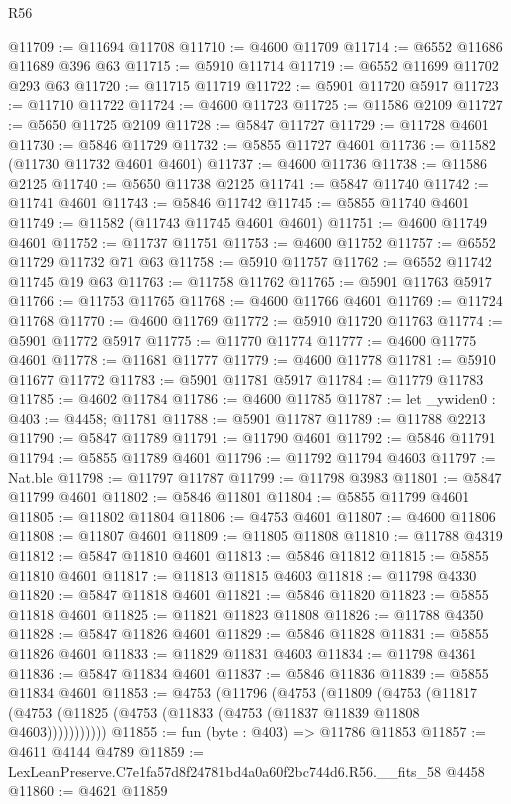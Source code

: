 \begin{lexlean}{R56}
\begin{coremodule}
@11709 := @11694 @11708
@11710 := @4600 @11709
@11714 := @6552 @11686 @11689 @396 @63
@11715 := @5910 @11714
@11719 := @6552 @11699 @11702 @293 @63
@11720 := @11715 @11719
@11722 := @5901 @11720 @5917
@11723 := @11710 @11722
@11724 := @4600 @11723
@11725 := @11586 @2109
@11727 := @5650 @11725 @2109
@11728 := @5847 @11727
@11729 := @11728 @4601
@11730 := @5846 @11729
@11732 := @5855 @11727 @4601
@11736 := @11582 (@11730 @11732 @4601 @4601)
@11737 := @4600 @11736
@11738 := @11586 @2125
@11740 := @5650 @11738 @2125
@11741 := @5847 @11740
@11742 := @11741 @4601
@11743 := @5846 @11742
@11745 := @5855 @11740 @4601
@11749 := @11582 (@11743 @11745 @4601 @4601)
@11751 := @4600 @11749 @4601
@11752 := @11737 @11751
@11753 := @4600 @11752
@11757 := @6552 @11729 @11732 @71 @63
@11758 := @5910 @11757
@11762 := @6552 @11742 @11745 @19 @63
@11763 := @11758 @11762
@11765 := @5901 @11763 @5917
@11766 := @11753 @11765
@11768 := @4600 @11766 @4601
@11769 := @11724 @11768
@11770 := @4600 @11769
@11772 := @5910 @11720 @11763
@11774 := @5901 @11772 @5917
@11775 := @11770 @11774
@11777 := @4600 @11775 @4601
@11778 := @11681 @11777
@11779 := @4600 @11778
@11781 := @5910 @11677 @11772
@11783 := @5901 @11781 @5917
@11784 := @11779 @11783
@11785 := @4602 @11784
@11786 := @4600 @11785
@11787 := let _ywiden0 : @403 := @4458; @11781
@11788 := @5901 @11787
@11789 := @11788 @2213
@11790 := @5847 @11789
@11791 := @11790 @4601
@11792 := @5846 @11791
@11794 := @5855 @11789 @4601
@11796 := @11792 @11794 @4603
@11797 := Nat.ble
@11798 := @11797 @11787
@11799 := @11798 @3983
@11801 := @5847 @11799 @4601
@11802 := @5846 @11801
@11804 := @5855 @11799 @4601
@11805 := @11802 @11804
@11806 := @4753 @4601
@11807 := @4600 @11806
@11808 := @11807 @4601
@11809 := @11805 @11808
@11810 := @11788 @4319
@11812 := @5847 @11810 @4601
@11813 := @5846 @11812
@11815 := @5855 @11810 @4601
@11817 := @11813 @11815 @4603
@11818 := @11798 @4330
@11820 := @5847 @11818 @4601
@11821 := @5846 @11820
@11823 := @5855 @11818 @4601
@11825 := @11821 @11823 @11808
@11826 := @11788 @4350
@11828 := @5847 @11826 @4601
@11829 := @5846 @11828
@11831 := @5855 @11826 @4601
@11833 := @11829 @11831 @4603
@11834 := @11798 @4361
@11836 := @5847 @11834 @4601
@11837 := @5846 @11836
@11839 := @5855 @11834 @4601
@11853 := @4753
    (@11796
      (@4753
        (@11809
          (@4753 (@11817 (@4753 (@11825 (@4753 (@11833 (@4753 (@11837 @11839 @11808 @4603)))))))))))
@11855 := fun (byte : @403) => @11786 @11853
@11857 := @4611 @4144 @4789
@11859 := LexLeanPreserve.C7e1fa57d8f24781bd4a0a60f2bc744d6.R56.__fits_58 @4458
@11860 := @4621 @11859

\end{coremodule}
\end{lexlean}
